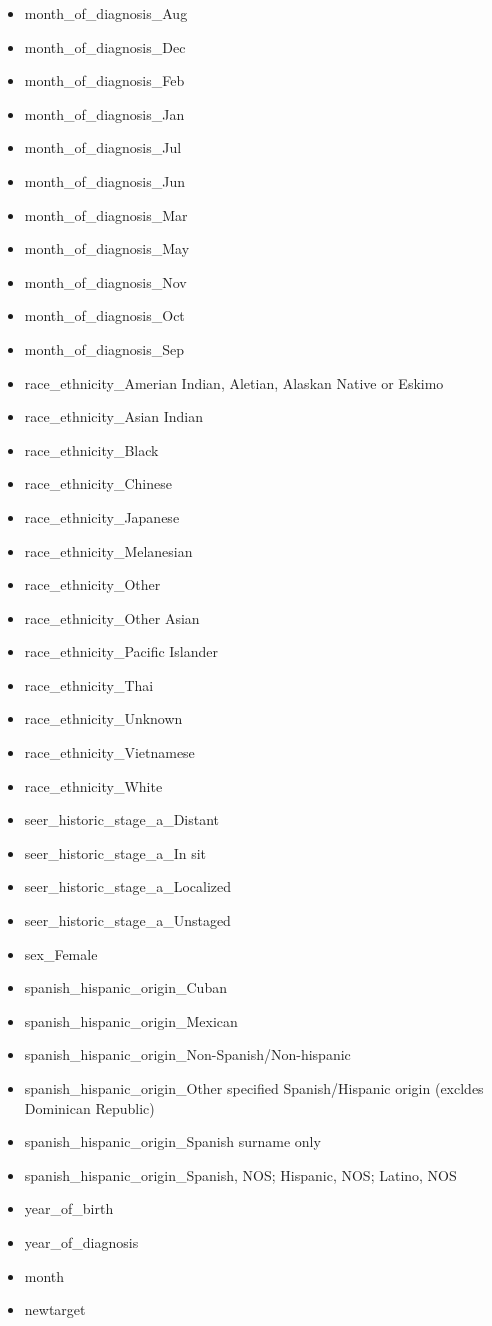 \documentclass[a4paper,11pt]{article}
\begin{document}
\begin{itemize}[noitemsep]
\item month\_of\_diagnosis\_Aug
\item month\_of\_diagnosis\_Dec
\item month\_of\_diagnosis\_Feb
\item month\_of\_diagnosis\_Jan
\item month\_of\_diagnosis\_Jul
\item month\_of\_diagnosis\_Jun
\item month\_of\_diagnosis\_Mar
\item month\_of\_diagnosis\_May
\item month\_of\_diagnosis\_Nov
\item month\_of\_diagnosis\_Oct
\item month\_of\_diagnosis\_Sep
\item race\_ethnicity\_Amerian Indian, Aletian, Alaskan Native or Eskimo
\item race\_ethnicity\_Asian Indian
\item race\_ethnicity\_Black
\item race\_ethnicity\_Chinese
\item race\_ethnicity\_Japanese
\item race\_ethnicity\_Melanesian
\item race\_ethnicity\_Other
\item race\_ethnicity\_Other Asian
\item race\_ethnicity\_Pacific Islander
\item race\_ethnicity\_Thai
\item race\_ethnicity\_Unknown
\item race\_ethnicity\_Vietnamese
\item race\_ethnicity\_White
\item seer\_historic\_stage\_a\_Distant
\item seer\_historic\_stage\_a\_In sit
\item seer\_historic\_stage\_a\_Localized
\item seer\_historic\_stage\_a\_Unstaged
\item sex\_Female
\item spanish\_hispanic\_origin\_Cuban
\item spanish\_hispanic\_origin\_Mexican
\item spanish\_hispanic\_origin\_Non-Spanish/Non-hispanic
\item spanish\_hispanic\_origin\_Other specified Spanish/Hispanic origin (excldes Dominican Republic)
\item spanish\_hispanic\_origin\_Spanish surname only
\item spanish\_hispanic\_origin\_Spanish, NOS; Hispanic, NOS; Latino, NOS
\item year\_of\_birth
\item year\_of\_diagnosis
\item month
\item newtarget
\end{itemize}
\end{document}
